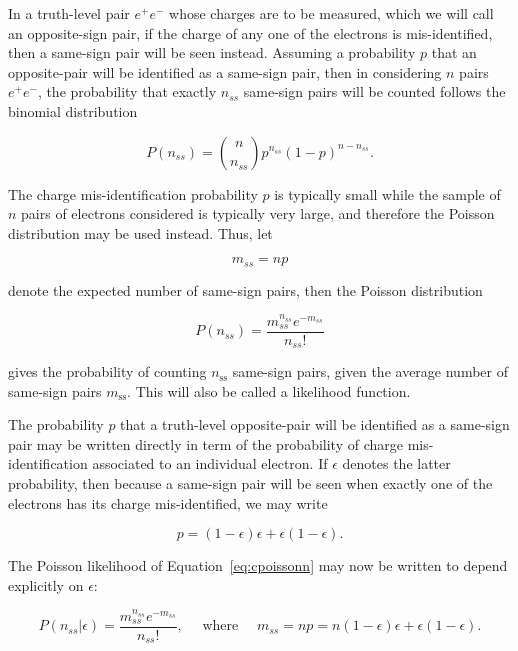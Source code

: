 In a truth-level pair $e^+e^-$ whose charges are to be measured, which we will
call an opposite-sign pair, if the charge of any one of the electrons is
mis-identified, then a same-sign pair will be seen instead. Assuming a
probability $p$ that an opposite-pair will be identified as a same-sign pair,
then in considering $n$ pairs $e^+e^-$, the probability that exactly $n_{ss}$
same-sign pairs will be counted follows the binomial distribution

$$
	P(n_{ss}) = \binom{n}{n_{ss}}p^{n_{ss}}(1-p)^{n-n_{ss}}.
$$

The charge mis-identification probability $p$ is typically small while the
sample of $n$ pairs of electrons considered is typically very large, and
therefore the Poisson distribution may be used instead. Thus, let

\begin{equation}\label{eq:cmss}
	m_{ss} = np
\end{equation}

denote the expected number of same-sign pairs, then the Poisson distribution


\begin{equation}\label{eq:cpoissonn}
	P(n_{ss}) = \frac{m_{ss}^{n_{ss}} e^{-m_{ss}}}{n_{ss}!}
\end{equation}

gives the probability of counting $n_{\text{ss}}$ same-sign pairs, given the
average number of same-sign pairs $m_{\text{ss}}$. This will also be called a
likelihood function.


The probability $p$ that a truth-level opposite-pair will be identified as a
same-sign pair may be written directly in term of the probability of charge
mis-identification associated to an individual electron. If $\epsilon$ denotes
the latter probability, then because a same-sign pair will be seen when exactly
one of the electrons has its charge mis-identified, we may write

\begin{equation}\label{eq:cprobpair}
	p = (1-\epsilon)\epsilon +  \epsilon(1-\epsilon).
\end{equation}

The Poisson likelihood of Equation~\ref{eq:cpoissonn} may now be written to
depend explicitly on $\epsilon$:

\begin{equation}\label{eq:cpoisson}
	P(n_{ss}|\epsilon) = \frac{m_{ss}^{n_{ss}} e^{-m_{ss}}}{n_{ss}!}, \quad
	\text{ where } \quad
	m_{ss} = np = n(1-\epsilon)\epsilon +  \epsilon(1-\epsilon).
\end{equation}

